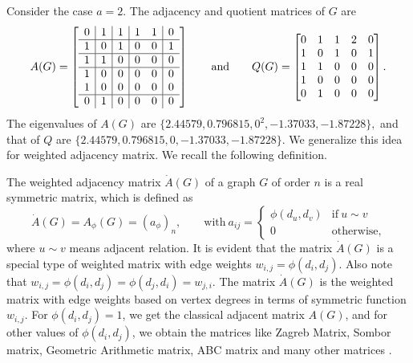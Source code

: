 \documentclass[12pt,twoside]{article}
\begin{document}
Consider the case $a=2$. The adjacency and quotient matrices of  $G$ are 
$$ A(G)=\left[ \begin{array}{c | c | c | c c | c}
	0 & 1 & 1 & 1 & 1 & 0 \\
	\hline
	1 & 0 & 1 & 0 & 0 & 1\\
	\hline
	1 & 1 & 0 & 0 & 0 & 0\\
	\hline
	1 & 0 & 0 & 0 & 0 & 0\\
	1 & 0 & 0 & 0 & 0 & 0\\
	\hline
	0 & 1 & 0 & 0 & 0 & 0
\end{array}\right]\qquad\text{and}\qquad Q(G)=\begin{bmatrix}
	0 & 1 & 1 & 2 & 0\\
	1 & 0 & 1 & 0 & 1\\
	1 & 1 & 0 & 0 & 0\\
	1 & 0 & 0 & 0 & 0\\
	0 & 1 & 0 & 0 & 0
\end{bmatrix}. $$
The eigenvalues of $A(G)$ are $\{2.44579, 0.796815, 0^{2}, -1.37033, -1.87228\},$ and that of $Q$ are $\{2.44579,0.796815,0,-1.37033,-1.87228\}.$ We generalize this idea for weighted adjacency matrix. We recall the following definition.



The weighted adjacency matrix $\dot{A}(G)$ of a graph $G$ of order $n$ is a real symmetric matrix, which is defined as 
\begin{equation*}\label{general adjacency matrix}
	\dot{A}(G)=A_{\phi}(G)=(a_{\phi})_{n},\qquad \text{with}~ a_{ij}=\begin{cases}
		\phi(d_{u},d_{v}) & \text{if} ~ u\sim v\\
		0 & \text{otherwise},
	\end{cases}
\end{equation*}
where $u\sim v$ means adjacent relation. It is evident that the  matrix $\dot{A}(G)$ is a special type of weighted matrix with edge weights $w_{i,j}= \phi(d_{i},d_{j})$. Also note that $ w_{i,j}= \phi(d_{i},d_{j})= \phi(d_{j},d_{i})=w_{j,i}.$
The  matrix $\dot{A}(G)$ is the weighted matrix with edge weights based on vertex degrees in terms of symmetric function $w_{i,j}$. For $\phi(d_{i},d_{j})=1 $, we get the classical adjacent matrix $A(G)$, and for other values of $\phi(d_{i},d_{j})$, we obtain  the matrices like Zagreb Matrix, Sombor matrix, Geometric Arithmetic matrix, ABC matrix and many other matrices \cite{bilalmath}. 
\end{document}
